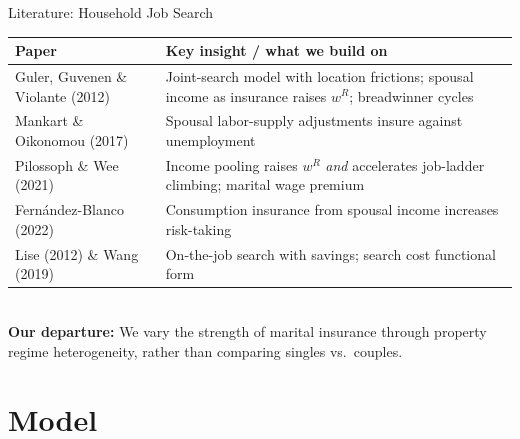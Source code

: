 \documentclass[aspectratio=169, 11pt]{beamer}
\newcommand{\wR}{w^R}
\begin{document}
\begin{frame}{Literature: Household Job Search}
\small
\begin{tabular}{p{4.2cm} p{8.2cm}}
\toprule
\textbf{Paper} & \textbf{Key insight / what we build on} \\
\midrule
Guler, Guvenen \& Violante (2012) & Joint-search model with location frictions; spousal income as insurance raises $\wR$; breadwinner cycles \\[0.3em]
Mankart \& Oikonomou (2017) & Spousal labor-supply adjustments insure against unemployment \\[0.3em]
Pilossoph \& Wee (2021) & Income pooling raises $\wR$ \emph{and} accelerates job-ladder climbing; marital wage premium \\[0.3em]
Fernández-Blanco (2022) & Consumption insurance from spousal income increases risk-taking \\[0.3em]
Lise (2012) \& Wang (2019) & On-the-job search with savings; search cost functional form \\
\bottomrule
\end{tabular} \\
\vspace{0.5em}
\normalsize
\textbf{Our departure:} We vary the strength of marital insurance through property regime heterogeneity, rather than comparing singles vs.\ couples.
\end{frame}



\section{Model}
\end{document}
